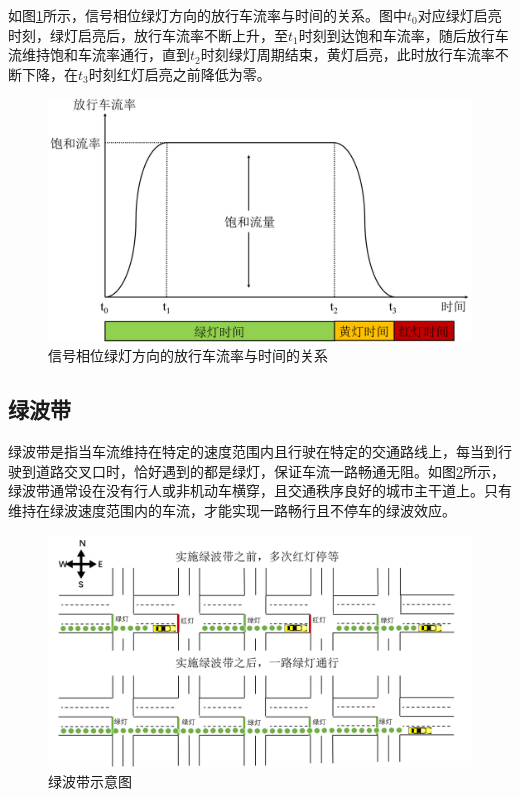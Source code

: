 如图\ref{fig:baoheliulv}所示，信号相位绿灯方向的放行车流率与时间的关系。图中${t_0}$对应绿灯启亮时刻，绿灯启亮后，放行车流率不断上升，至${t_1}$时刻到达饱和车流率，随后放行车流维持饱和车流率通行，直到${t_2}$时刻绿灯周期结束，黄灯启亮，此时放行车流率不断下降，在${t_3}$时刻红灯启亮之前降低为零。


\begin{figure}[ht]
	\centering
	\includegraphics[width=\textwidth]{figures/baoheliulv.png}
	\caption{信号相位绿灯方向的放行车流率与时间的关系}
	\label{fig:baoheliulv}
\end{figure}


\subsection{绿波带}

绿波带是指当车流维持在特定的速度范围内且行驶在特定的交通路线上，每当到行驶到道路交叉口时，恰好遇到的都是绿灯，保证车流一路畅通无阻\cite{zhaoyi,ma2019green}。如图\ref{fig:greenwave}所示，绿波带通常设在没有行人或非机动车横穿，且交通秩序良好的城市主干道上。只有维持在绿波速度范围内的车流，才能实现一路畅行且不停车的绿波效应。
\begin{figure}[ht]
	\centering
	\includegraphics[width=\textwidth]{figures/greenwave.png}
	\caption{绿波带示意图}
	\label{fig:greenwave}
\end{figure}


